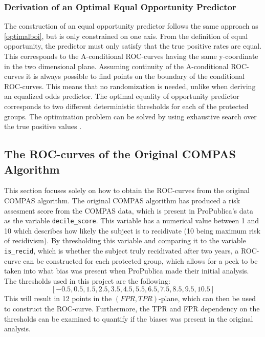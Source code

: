 \documentclass[11pt, fleqn, titlepage]{article}
\begin{document}
	\subsubsection{Derivation of an Optimal Equal Opportunity Predictor}\label{optimalboi equal_oppor}
	
	The construction of an equal opportunity predictor follows the same approach as \ref{optimalboi}, but is only constrained on one axis. From the definition of equal opportunity, the predictor must only satisfy that the true positive rates are equal. This corresponds to the A-conditional ROC-curves having the same y-coordinate in the two dimensional plane. Assuming continuity of the A-conditional ROC-curves it is always possible to find points on the boundary of the conditional ROC-curves. This means that no randomization is needed, unlike when deriving an equalized odds predictor. The optimal equality of opportunity predictor corresponds to two different deterministic thresholds for each of the protected groups. The optimization problem can be solved by using exhaustive search over the true positive values \cite{equal_of_oppor}.
	
	\subsection{The ROC-curves of the Original COMPAS Algorithm}
	
	This section focuses solely on how to obtain the ROC-curves from the original COMPAS algorithm. The original COMPAS algorithm has produced a risk assesment score from the COMPAS data, which is present in ProPublica's data as the variable \texttt{decile\_score}. This variable has a numerical value between 1 and 10 which describes how likely the subject is to recidivate (10 being maximum risk of recidivism). By thresholding this variable and comparing it to the variable \texttt{is\_recid}, which is whether the subject truly recidivated after two years, a ROC-curve can be constructed for each protected group, which allows for a peek to be taken into what bias was present when ProPublica made their initial analysis. The thresholds used in this project are the following: 
	\[ [-0.5,  0.5,  1.5, 2.5,  3.5,  4.5, 5.5,  6.5,  7.5,  8.5,  9.5, 10.5] \]
	This will result in 12 points in the $ (FPR,TPR) $-plane, which can then be used to construct the ROC-curve. Furthermore, the TPR and FPR dependency on the thresholds can be examined to quantify if the biases was present in the original analysis.
	
	
\end{document}
